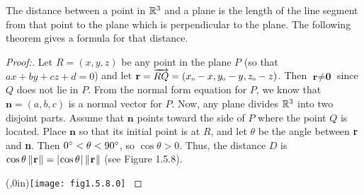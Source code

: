 The distance between a point in $\mathbb{R}^{3}$ and a plane is the length of the line segment from that point to the plane
which is perpendicular to the plane. The following theorem gives a formula for that distance.
\begin{proofbar}\vspace{-3mm}\begin{proof}[Proof:]
 \par\noindent Let $R = (x,y,z)$ be any point in the plane $P$ (so that $ax + by + cz + d = 0$)
 and let $\textbf{r} = \overrightarrow{RQ} =
 (x_{\scriptscriptstyle 0} - x,y_{\scriptscriptstyle 0} - y,z_{\scriptscriptstyle 0} - z)$. Then $\textbf{r} \ne \textbf{0}$ since $Q$ does not lie in $P$.
 From the normal form equation for $P$, we know that $\textbf{n} = (a,b,c)$ is a normal vector for $P$. Now, any plane
 divides $\mathbb{R}^{3}$ into two disjoint parts. Assume that $\textbf{n}$ points toward the side of $P$ where the point
 $Q$ is located. Place $\textbf{n}$ so that its initial point is at $R$, and let $\theta$ be the angle between
 \textbf{r} and \textbf{n}. Then $0^\circ < \theta < 90^\circ$, so $\cos \theta > 0$. Thus, the distance $D$ is
 $\cos \theta \,\lVert\mspace{1mu}\textbf{r}\mspace{1mu}\rVert = \lvert\mspace{1mu}\cos \theta\mspace{1mu}\rvert\,\lVert\mspace{1mu}\textbf{r}\mspace{1mu}\rVert$ (see Figure 1.5.8).

 \piccaption[]{}\parpic(\textwidth,0in){\texttt{[image: fig1.5.8.0]}
 \piccaptioninside}
 \par\mbox{}\newline\vspace{1mm}


\end{proof}
\end{proofbar}
